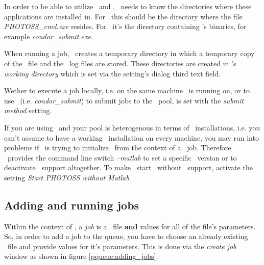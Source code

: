 	In order to be able to utilize \PHO\ and \Condor,
	\PQUEUE\ needs to know the directories where these applications are installed in.
	For \PHO\ this should be the directory where the file \textit{PHOTOSS\_cmd.exe} resides.
	For \Condor\ it's the directory containing \Condor's binaries, for example \textit{condor\_submit.exe}.
	
	When running a job,
	\PQUEUE\ creates a temporary directory in which a temporary copy of the \PJOB\ file
	and the \Condor\ log files are stored.
	These directories are created in \PQUEUE's \textit{working directory}
	which is set via the setting's dialog third text field.
	
	Wether to execute a job locally, i.e. on the same machine \PQUEUE\ is running on,
	or to use \Condor\ (i.e. \textit{condor\_submit}) to submit jobs to the \Condor\ pool,
	is set with the \textit{submit method} setting.
	
	If you are using \Condor\ and your pool is heterogenous in terms of \MAT\ installations,
	i.e. you can't assume to have a working \MAT\ installation on every machine,
	you may run into problems if \PHO\ is trying to initialize \MAT\ from the context of a \Condor\ job.
	Therefore \PHO\ provides the command line switch \textit{--matlab} to set a specific \MAT\ version
	or to deactivate \MAT\ support altogether.
	To make \PQUEUE\ start \PHO\ without \MAT\ support,
	activate the setting \textit{Start PHOTOSS without Matlab}.





\subsection{Adding and running jobs}
\label{pqueue:running_jobs}

Within the context of \PQUEUE,
a \textit{job} is a \PJOB\ file \textbf{and} values for all of the file's parameters.
So, in order to add a job to the queue,
you have to choose an already existing \PJOB\ file and provide values for it's parameters.
This is done via the \textit{create job} window as shown in figure \ref{pqueue:adding_jobs}.

